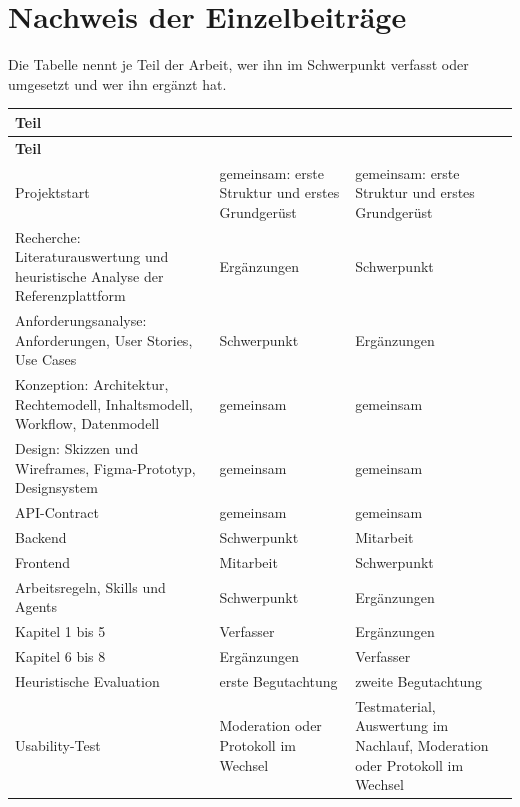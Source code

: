 \clearpage

\section*{Nachweis der Einzelbeiträge}

Die Tabelle nennt je Teil der Arbeit, wer ihn im Schwerpunkt verfasst oder umgesetzt und wer ihn ergänzt hat.

\begingroup
\footnotesize
\setlength{\tabcolsep}{4pt}
\renewcommand{\arraystretch}{1.1}
\setlength{\LTcapwidth}{\textwidth}
\begin{longtable}{@{}L{3.6cm}L{5.5cm}L{5.5cm}@{}}
	\toprule
	\textbf{Teil} & \textbf{\AutorEins} & \textbf{\AutorZwei} \\
	\midrule
	\endfirsthead
	\toprule
	\textbf{Teil} & \textbf{\AutorEins} & \textbf{\AutorZwei} \\
	\midrule
	\endhead
	\bottomrule
	\endfoot
	Projektstart & gemeinsam: erste Struktur und erstes Grundgerüst & gemeinsam: erste Struktur und erstes Grundgerüst \\
	\zeilenlinie
	Recherche: Literaturauswertung und heuristische Analyse der Referenzplattform & Ergänzungen & Schwerpunkt \\
	\zeilenlinie
	Anforderungsanalyse: Anforderungen, User Stories, Use Cases & Schwerpunkt & Ergänzungen \\
	\zeilenlinie
	Konzeption: Architektur, Rechtemodell, Inhaltsmodell, Workflow, Datenmodell & gemeinsam & gemeinsam \\
	\zeilenlinie
	Design: Skizzen und Wireframes, Figma-Prototyp, Designsystem & gemeinsam & gemeinsam \\
	\zeilenlinie
	API-Contract & gemeinsam & gemeinsam \\
	\zeilenlinie
	Backend & Schwerpunkt & Mitarbeit \\
	\zeilenlinie
	Frontend & Mitarbeit & Schwerpunkt \\
	\zeilenlinie
	Arbeitsregeln, Skills und Agents & Schwerpunkt & Ergänzungen \\
	\zeilenlinie
	Kapitel 1 bis 5 & Verfasser & Ergänzungen \\
	\zeilenlinie
	Kapitel 6 bis 8 & Ergänzungen & Verfasser \\
	\zeilenlinie
	Heuristische Evaluation & erste Begutachtung & zweite Begutachtung \\
	\zeilenlinie
	Usability-Test & Moderation oder Protokoll im Wechsel & Testmaterial, Auswertung im Nachlauf, Moderation oder Protokoll im Wechsel \\
\end{longtable}
\endgroup
